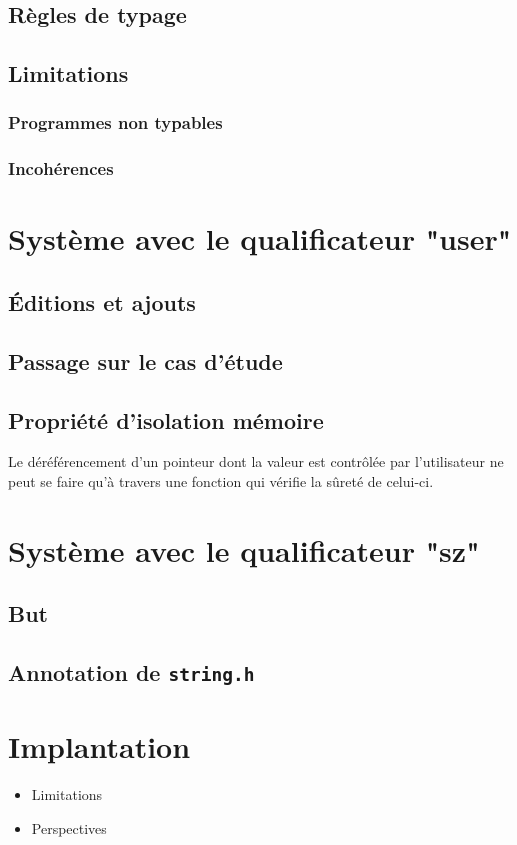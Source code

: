 \documentclass{phdthesis}
\begin{document}
\section{Règles de typage}
\section{Limitations}
\subsection{Programmes non typables}
\subsection{Incohérences}

\chapter{Système avec le qualificateur "user"}

\section{Éditions et ajouts}
\section{Passage sur le cas d'étude}

\section{Propriété d'isolation mémoire}

Le déréférencement d'un pointeur dont la valeur est contrôlée par l'utilisateur
ne peut se faire qu'à travers une fonction qui vérifie la sûreté de celui-ci.

\chapter{Système avec le qualificateur "sz"}

\section{But}
\section{Annotation de \texttt{string.h}}

\chapter{Implantation}


\begin{itemize}
  \item Limitations
  \item Perspectives
\end{itemize}




\end{document}
